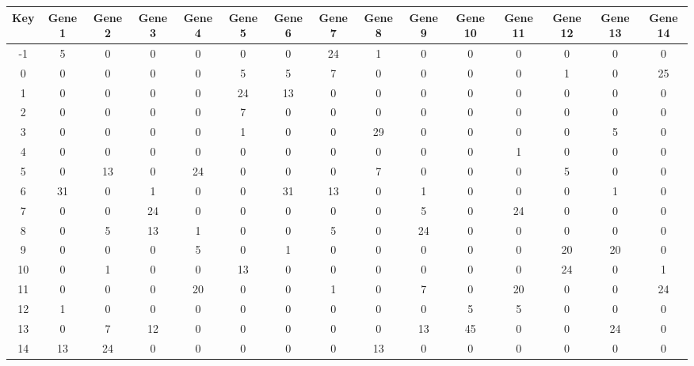 \begin{tabular}{|c|c|c|c|c|c|c|c|c|c|c|c|c|c|c|}
\hline
Key & Gene 1 & Gene 2 & Gene 3 & Gene 4 & Gene 5 & Gene 6 & Gene 7 & Gene 8 & Gene 9 & Gene 10 & Gene 11 & Gene 12 & Gene 13 & Gene 14 \\
\hline
-1 & 5 & 0 & 0 & 0 & 0 & 0 & 24 & 1 & 0 & 0 & 0 & 0 & 0 & 0 \\
0 & 0 & 0 & 0 & 0 & 5 & 5 & 7 & 0 & 0 & 0 & 0 & 1 & 0 & 25 \\
1 & 0 & 0 & 0 & 0 & 24 & 13 & 0 & 0 & 0 & 0 & 0 & 0 & 0 & 0 \\
2 & 0 & 0 & 0 & 0 & 7 & 0 & 0 & 0 & 0 & 0 & 0 & 0 & 0 & 0 \\
3 & 0 & 0 & 0 & 0 & 1 & 0 & 0 & 29 & 0 & 0 & 0 & 0 & 5 & 0 \\
4 & 0 & 0 & 0 & 0 & 0 & 0 & 0 & 0 & 0 & 0 & 1 & 0 & 0 & 0 \\
5 & 0 & 13 & 0 & 24 & 0 & 0 & 0 & 7 & 0 & 0 & 0 & 5 & 0 & 0 \\
6 & 31 & 0 & 1 & 0 & 0 & 31 & 13 & 0 & 1 & 0 & 0 & 0 & 1 & 0 \\
7 & 0 & 0 & 24 & 0 & 0 & 0 & 0 & 0 & 5 & 0 & 24 & 0 & 0 & 0 \\
8 & 0 & 5 & 13 & 1 & 0 & 0 & 5 & 0 & 24 & 0 & 0 & 0 & 0 & 0 \\
9 & 0 & 0 & 0 & 5 & 0 & 1 & 0 & 0 & 0 & 0 & 0 & 20 & 20 & 0 \\
10 & 0 & 1 & 0 & 0 & 13 & 0 & 0 & 0 & 0 & 0 & 0 & 24 & 0 & 1 \\
11 & 0 & 0 & 0 & 20 & 0 & 0 & 1 & 0 & 7 & 0 & 20 & 0 & 0 & 24 \\
12 & 1 & 0 & 0 & 0 & 0 & 0 & 0 & 0 & 0 & 5 & 5 & 0 & 0 & 0 \\
13 & 0 & 7 & 12 & 0 & 0 & 0 & 0 & 0 & 13 & 45 & 0 & 0 & 24 & 0 \\
14 & 13 & 24 & 0 & 0 & 0 & 0 & 0 & 13 & 0 & 0 & 0 & 0 & 0 & 0 \\
\hline
\end{tabular}